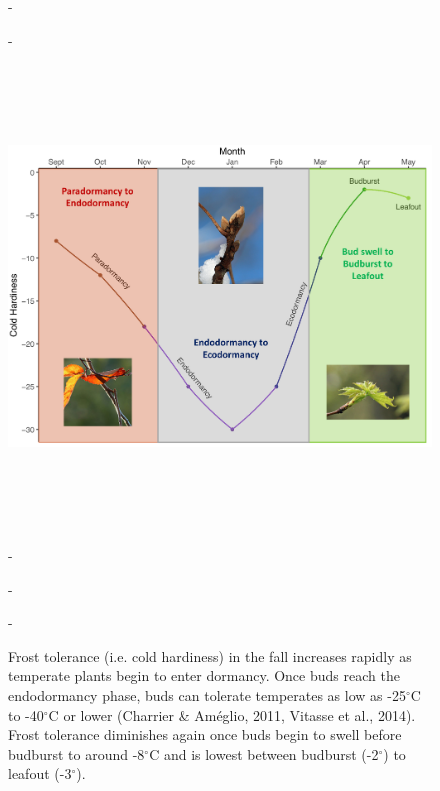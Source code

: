 \documentclass{article}\usepackage[]{graphicx}\usepackage[]{color}
\begin{document}
\begin{figure} [H] 
 -\begin{center}
 -\includegraphics[width=16cm, height=13cm]{..//figure/hardinessfig_detailed.png} 
 -\caption{Frost tolerance (i.e. cold hardiness) in the fall increases rapidly as temperate plants begin to enter dormancy. Once buds reach the endodormancy phase, buds can tolerate temperates as low as -25$^{\circ}$C to -40$^{\circ}$C or lower (Charrier \& Am\'{e}glio, 2011, Vitasse et al., 2014). Frost tolerance diminishes again once buds begin to swell before budburst to around -8$^{\circ}$C and is lowest between budburst (-2$^{\circ}$) to leafout (-3$^{\circ}$). }\label{fig:hardiness} 
 -\end{center}
 -\end{figure}
\end{document}
